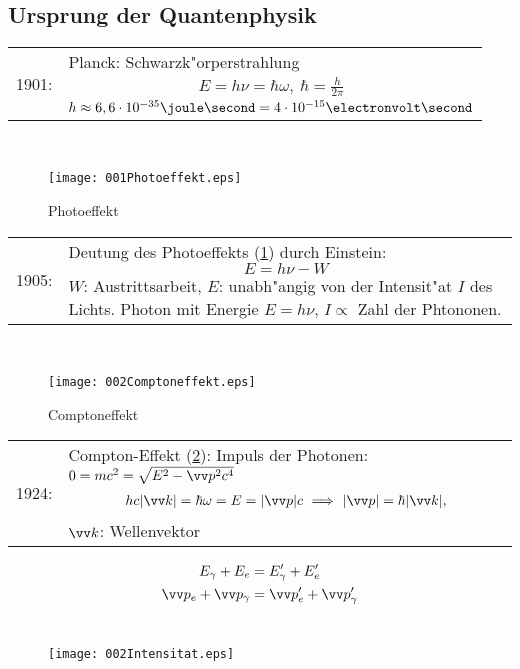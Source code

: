 \documentclass[a4paper]{scrartcl}
\begin{document}
\subsection{Ursprung der Quantenphysik}



\begin{tabular}{l p{400pt}}
1901:	& 
Planck: Schwarzk"orperstrahlung 
  \begin{align}
  E = h \nu = \hbar \omega, \  \hbar = \frac{h}{2 \pi}
  \end{align}
  $h \approx 6,6 \cdot 	10^{-35} \joule \second= 4 \cdot 10^{-15} \electronvolt \second$
\end{tabular}
\\

\begin{figure}[h]
\centering
\texttt{[image: 001Photoeffekt.eps]} 
\caption{Photoeffekt}
\label{Photoeffekt1}
\end{figure}

\begin{tabular}{l p{400pt}}
1905: &
Deutung des Photoeffekts (\ref{Photoeffekt1}) durch Einstein: 
$$E = h\nu - W$$
$W$: Austrittsarbeit, $E$: unabh"angig von der Intensit"at $I$ des Lichts. Photon mit Energie $E = h \nu$, $I \propto $ Zahl der Phtononen.
\end{tabular}
\\

\begin{figure}[h]
\centering
\texttt{[image: 002Comptoneffekt.eps]} 
\caption{Comptoneffekt}
\label{Comptoneffekt1}
\end{figure}

\begin{tabular}{l p{400pt}}
1924: &
Compton-Effekt (\ref{Comptoneffekt1}): Impuls der Photonen: $0 = mc^2 = \sqrt{ E^2 - \vv p^2 c^4 }$
\begin{align}
h c \vert \vv k \vert = \hbar \omega = E = \vert \vv p \vert c \ \Longrightarrow \ \vert \vv p \vert = \hbar \vert\vv k \vert,
\end{align}
$\vv k$: Wellenvektor
\end{tabular}
\begin{align*}
E_\gamma + E_e & = E_\gamma' + E_e' \\
\vv p_e + \vv p_\gamma & = \vv p_e' + \vv p_\gamma'
\end{align*}
\\
\begin{figure}[h]
\centering
\texttt{[image: 002Intensitat.eps]} 
\label{002Intensitat}
\end{figure}
\end{document}
